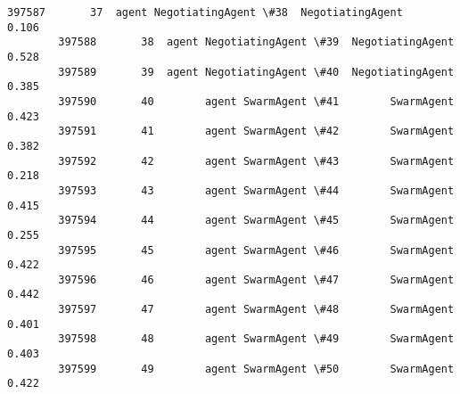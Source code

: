 \documentclass[11pt]{article}
\begin{document}
\begin{Verbatim}[commandchars=\\\{\}]
        397587       37  agent NegotiatingAgent \#38  NegotiatingAgent         0.106   
        397588       38  agent NegotiatingAgent \#39  NegotiatingAgent         0.528   
        397589       39  agent NegotiatingAgent \#40  NegotiatingAgent         0.385   
        397590       40        agent SwarmAgent \#41        SwarmAgent         0.423   
        397591       41        agent SwarmAgent \#42        SwarmAgent         0.382   
        397592       42        agent SwarmAgent \#43        SwarmAgent         0.218   
        397593       43        agent SwarmAgent \#44        SwarmAgent         0.415   
        397594       44        agent SwarmAgent \#45        SwarmAgent         0.255   
        397595       45        agent SwarmAgent \#46        SwarmAgent         0.422   
        397596       46        agent SwarmAgent \#47        SwarmAgent         0.442   
        397597       47        agent SwarmAgent \#48        SwarmAgent         0.401   
        397598       48        agent SwarmAgent \#49        SwarmAgent         0.403   
        397599       49        agent SwarmAgent \#50        SwarmAgent         0.422   
        

\end{Verbatim}
\end{document}
